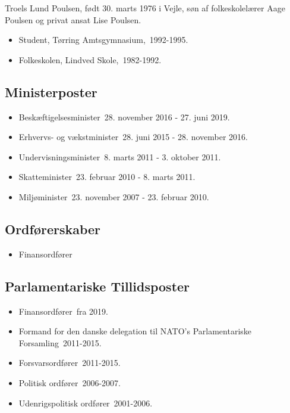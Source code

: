 \documentclass[11pt, a4paper]{awesome-cv}
\begin{document}
\makecvheader[R]
\makelettertitle
\begin{cvletter}
Troels Lund Poulsen, født 30. marts 1976 i Vejle, søn af folkeskolelærer Aage Poulsen og privat ansat Lise Poulsen.

\begin{itemize}
\item Student, Tørring Amtsgymnasium, 1992-1995.
\item Folkeskolen, Lindved Skole, 1982-1992.
\end{itemize}
\subsection*{Ministerposter}
\begin{itemize}
\item Beskæftigelsesminister 28. november 2016 - 27. juni 2019.
\item Erhvervs- og vækstminister 28. juni 2015 - 28. november 2016.
\item Undervisningsminister 8. marts 2011 - 3. oktober 2011.
\item Skatteminister 23. februar 2010 - 8. marts 2011.
\item Miljøminister 23. november 2007 - 23. februar 2010.
\end{itemize}
\subsection*{Ordførerskaber}
\begin{itemize}
\item Finansordfører
\end{itemize}
\subsection*{Parlamentariske Tillidsposter}
\begin{itemize}
\item Finansordfører fra 2019.
\item Formand for den danske delegation til NATO's Parlamentariske Forsamling 2011-2015.
\item Forsvarsordfører 2011-2015.
\item Politisk ordfører 2006-2007.
\item Udenrigspolitisk ordfører 2001-2006.
\end{itemize}

\end{cvletter}
\end{document}
